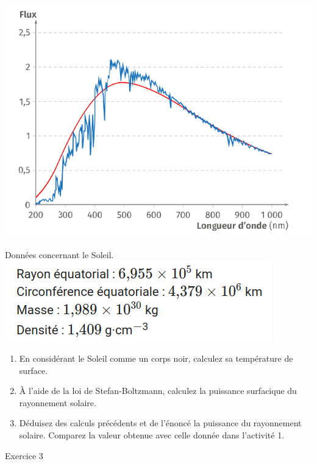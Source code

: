 \documentclass[10pt]{article}
\begin{document}
\begin{minipage}[c]{0.45\textwidth}
	\centering
	\includegraphics[scale=0.45]{ex_stefan_boltzmann/graph.png}
\end{minipage}
\hspace{0.1\textwidth}
\begin{minipage}[c]{0.45\textwidth}
	\centering Données concernant le Soleil.
	\includegraphics[scale=0.45]{ex_stefan_boltzmann/carte.png}

	\begin{enumerate}
		\item En considérant le Soleil comme un corps noir, calculez sa température de surface.
		\item À l'aide de la loi de Stefan-Boltzmann, calculez la puissance surfacique du rayonnement solaire.
		\item Déduisez des calculs précédents et de l'énoncé la puissance du rayonnement solaire. Comparez la valeur obtenue avec celle donnée dans l'activité 1.
	\end{enumerate}
\end{minipage}

\clearpage


\begin{center}
	Exercice 3
\end{center}
\end{document}
